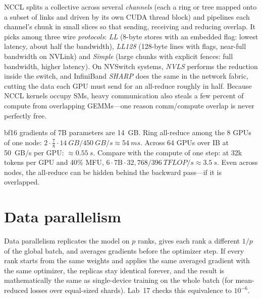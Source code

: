 \begin{deepdive}
NCCL splits a collective across several \emph{channels} (each a ring or tree mapped onto a
subset of links and driven by its own CUDA thread block) and pipelines each channel's chunk in
small slices so that sending, receiving and reducing overlap. It picks among three wire
\emph{protocols}: \emph{LL} (8-byte stores with an embedded flag: lowest latency, about half the
bandwidth), \emph{LL128} (128-byte lines with flags, near-full bandwidth on NVLink) and
\emph{Simple} (large chunks with explicit fences: full bandwidth, higher latency). On NVSwitch
systems, \emph{NVLS} performs the reduction inside the switch, and InfiniBand \emph{SHARP} does
the same in the network fabric, cutting the data each GPU must send for an all-reduce roughly in
half. Because NCCL kernels occupy SMs, heavy communication also steals a few percent of compute
from overlapping GEMMs---one reason comm/compute overlap is never perfectly free.
\end{deepdive}

\begin{napkinmath}
bf16 gradients of 7B parameters are \SI{14}{GB}. Ring all-reduce among the 8 GPUs of one node:
$2\cdot\frac78\cdot\SI{14}{GB}/\SI{450}{GB/s}\approx\SI{54}{ms}$. Across 64 GPUs over IB at
\SI{50}{GB/s} per GPU: $\approx\SI{0.55}{s}$. Compare with the compute of one step: at 32k
tokens per GPU and 40\% MFU, $6\cdot7\text{B}\cdot32{,}768/\SI{396}{TFLOP/s}\approx\SI{3.5}{s}$.
Even across nodes, the all-reduce can be hidden behind the backward pass---if it is overlapped.
\end{napkinmath}

\section{Data parallelism}\label{sec:dist:dp}

Data parallelism replicates the model on $p$ ranks, gives each rank a different $1/p$ of the
global batch, and averages gradients before the optimizer step. If every rank starts from the
same weights and applies the same averaged gradient with the same optimizer, the replicas stay
identical forever, and the result is mathematically the same as single-device training on the
whole batch (for mean-reduced losses over equal-sized shards). Lab~17 checks this equivalence
to $10^{-6}$.

